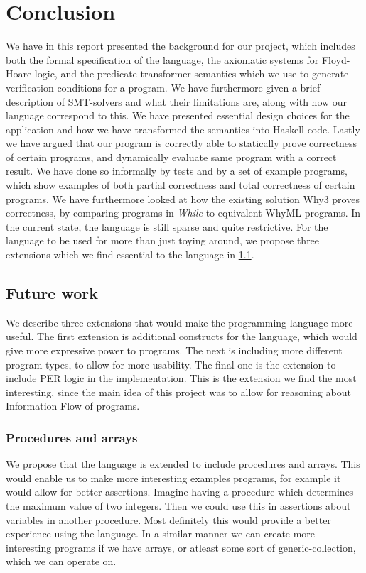 \section{Conclusion}\label{sec:conclusion}
We have in this report presented the background for our project, which includes both the formal specification of the language, the axiomatic systems for Floyd-Hoare logic, and the predicate transformer semantics which we use to generate verification conditions for a program.
We have furthermore given a brief description of SMT-solvers and what their limitations are, along with how our language correspond to this.
We have presented essential design choices for the application and how we have transformed the semantics into Haskell code.
Lastly we have argued that our program is correctly able to statically prove correctness of certain programs, and dynamically evaluate same program with a correct result.
We have done so informally by tests and by a set of example programs, which show examples of both partial correctness and total correctness of certain programs.
We have furthermore looked at how the existing solution Why3 proves correctness, by comparing programs in \textit{While} to equivalent WhyML programs.
In the current state, the language is still sparse and quite restrictive. 
For the language to be used for more than just toying around, we propose three extensions which we find essential to the language in \cref{sec:future}.

\subsection{Future work}\label{sec:future}
We describe three extensions that would make the programming language more useful. 
The first extension is additional constructs for the language, which would give more expressive power to programs. 
The next is including more different program types, to allow for more usability. 
The final one is the extension to include PER logic in the implementation. This is the extension we find the most interesting, since the main idea of this project was to allow for reasoning about Information Flow of programs.

\subsubsection{Procedures and arrays}
We propose that the language is extended to include procedures and arrays. 
This would enable us to make more interesting examples programs, for example it would allow for better assertions. 
Imagine having a procedure which determines the maximum value of two integers. 
Then we could use this in assertions about variables in another procedure. 
Most definitely this would provide a better experience using the language. 
In a similar manner we can create more interesting programs if we have arrays, or atleast some sort of generic-collection, which we can operate on.

